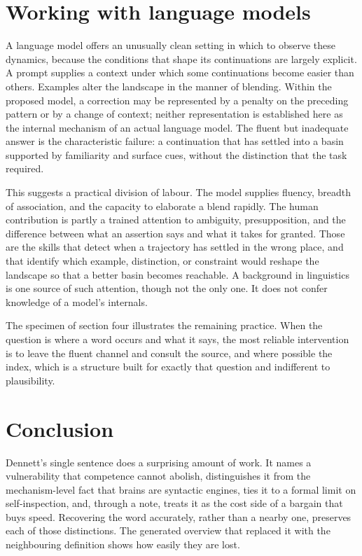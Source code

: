 \documentclass[11pt]{article}
\begin{document}
\section{Working with language models}

A language model offers an unusually clean setting in which to observe these dynamics, because the conditions that shape its continuations are largely explicit. A prompt supplies a context under which some continuations become easier than others. Examples alter the landscape in the manner of blending. Within the proposed model, a correction may be represented by a penalty on the preceding pattern or by a change of context; neither representation is established here as the internal mechanism of an actual language model. The fluent but inadequate answer is the characteristic failure: a continuation that has settled into a basin supported by familiarity and surface cues, without the distinction that the task required.

This suggests a practical division of labour. The model supplies fluency, breadth of association, and the capacity to elaborate a blend rapidly. The human contribution is partly a trained attention to ambiguity, presupposition, and the difference between what an assertion says and what it takes for granted. Those are the skills that detect when a trajectory has settled in the wrong place, and that identify which example, distinction, or constraint would reshape the landscape so that a better basin becomes reachable. A background in linguistics is one source of such attention, though not the only one. It does not confer knowledge of a model's internals.

The specimen of section four illustrates the remaining practice. When the question is where a word occurs and what it says, the most reliable intervention is to leave the fluent channel and consult the source, and where possible the index, which is a structure built for exactly that question and indifferent to plausibility.

\section{Conclusion}

Dennett's single sentence does a surprising amount of work. It names a vulnerability that competence cannot abolish, distinguishes it from the mechanism-level fact that brains are syntactic engines, ties it to a formal limit on self-inspection, and, through a note, treats it as the cost side of a bargain that buys speed. Recovering the word accurately, rather than a nearby one, preserves each of those distinctions. The generated overview that replaced it with the neighbouring definition shows how easily they are lost.
\end{document}
